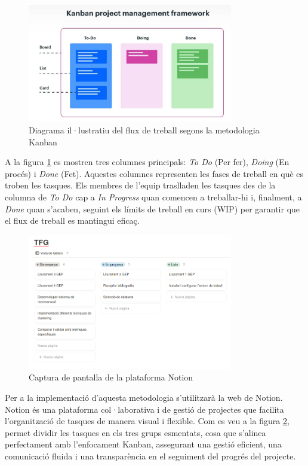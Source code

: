 \documentclass[a4paper,12pt]{report}
\begin{document}
\begin{figure}[H]
    \centering
    \includegraphics[width=0.8\textwidth]{Figuras/KANBAN.png}
    \caption{Diagrama il·lustratiu del flux de treball segons la metodologia Kanban \cite{Person_2025}}
    \label{fig:kanban}
\end{figure}

A la figura \ref{fig:kanban} es mostren tres columnes principals: \textit{To Do} (Per fer), \textit{Doing} (En procés) i \textit{Done} (Fet).
Aquestes columnes representen les fases de treball en què es troben les tasques. Els membres de l'equip traslladen les tasques des de la columna de \textit{To Do} cap a \textit{In Progress} quan comencen a treballar-hi i, finalment, a \textit{Done} quan s’acaben, seguint els límits de treball en curs (WIP) per garantir que el flux de treball es mantingui eficaç.

\begin{figure} [H]
    \centering
    \includegraphics[width=0.8\textwidth]{Figuras/Notion.png}
    \caption{Captura de pantalla de la plataforma Notion}
    \label{fig:notion}
\end{figure}

Per a la implementació d'aquesta metodologia s'utilitzarà la web de Notion.
Notion és una plataforma col·laborativa i de gestió de projectes que facilita l'organització de tasques de manera visual i flexible.
Com es veu a la figura \ref{fig:notion}, permet dividir les tasques en els tres grups esmentats, cosa que s'alinea perfectament amb l'enfocament Kanban, assegurant una gestió eficient, una comunicació fluida i una transparència en el seguiment del progrés del projecte.
\end{document}
